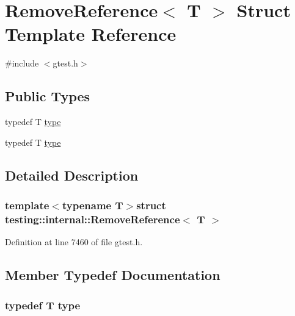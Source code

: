 \hypertarget{structtesting_1_1internal_1_1RemoveReference}{\section{\-Remove\-Reference$<$ \-T $>$ \-Struct \-Template \-Reference}
\label{d6/da7/structtesting_1_1internal_1_1RemoveReference}
}


{\ttfamily \#include $<$gtest.\-h$>$}

\subsection*{\-Public \-Types}
\begin{DoxyCompactItemize}
\item 
typedef \-T \hyperlink{structtesting_1_1internal_1_1RemoveReference_a565429e62c1d4fd084335146ba778e17}{type}
\item 
typedef \-T \hyperlink{structtesting_1_1internal_1_1RemoveReference_a565429e62c1d4fd084335146ba778e17}{type}
\end{DoxyCompactItemize}


\subsection{\-Detailed \-Description}
\subsubsection*{template$<$typename T$>$struct testing\-::internal\-::\-Remove\-Reference$<$ T $>$}



\-Definition at line 7460 of file gtest.\-h.



\subsection{\-Member \-Typedef \-Documentation}
\hypertarget{structtesting_1_1internal_1_1RemoveReference_a565429e62c1d4fd084335146ba778e17}{
\subsubsection[{type}]{\setlength{\rightskip}{0pt plus 5cm}typedef \-T {\bf type}}}\label{d6/da7/structtesting_1_1internal_1_1RemoveReference_a565429e62c1d4fd084335146ba778e17}


